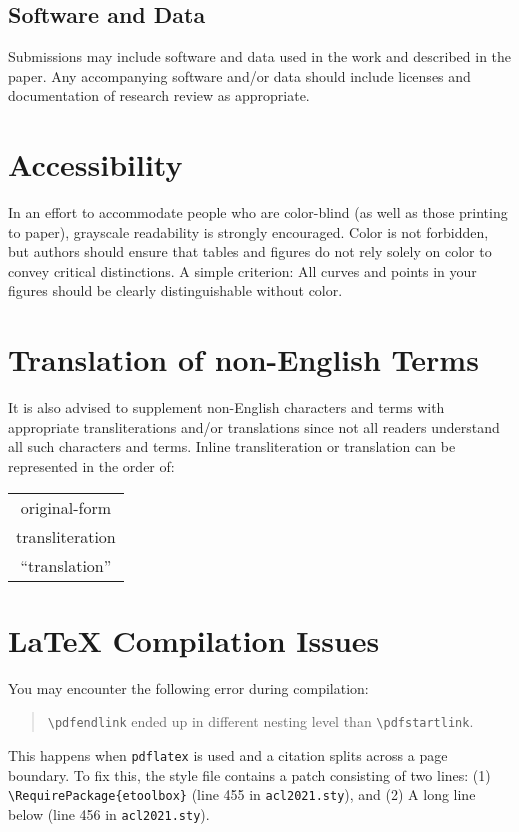 \documentclass[11pt,a4paper]{article}
\begin{document}
	\subsection{Software and Data}
	\label{sec:software_and_data}
	Submissions may include software and data used in the work and described in the paper.
	Any accompanying software and/or data should include licenses and documentation of research review as appropriate.
	
	\section{Accessibility}
	\label{ssec:accessibility}
	
	In an effort to accommodate people who are color-blind (as well as those printing to paper), grayscale readability is strongly encouraged.
	Color is not forbidden, but authors should ensure that tables and figures do not rely solely on color to convey critical distinctions.
	A simple criterion:
	All curves and points in your figures should be clearly distinguishable without color.
	
	\section{Translation of non-English Terms}
	
	It is also advised to supplement non-English characters and terms with appropriate transliterations and/or translations since not all readers understand all such characters and terms.
	Inline transliteration or translation can be represented in the order of:
	\begin{center}
		\begin{tabular}{c}
			original-form \\
			transliteration \\
			``translation''
		\end{tabular}
	\end{center}
	
	\section{\LaTeX{} Compilation Issues}
	You may encounter the following error during compilation: 
	\begin{quote}
		{\small\verb|\pdfendlink|} ended up in different nesting level than {\small\verb|\pdfstartlink|}.
	\end{quote}
	This happens when \texttt{\small pdflatex} is used and a citation splits across a page boundary.
	To fix this, the style file contains a patch consisting of two lines:
	(1) {\small\verb|\RequirePackage{etoolbox}|} (line 455 in \texttt{\small acl2021.sty}), and
	(2) A long line below (line 456 in \texttt{\small acl2021.sty}).
	
\end{document}
